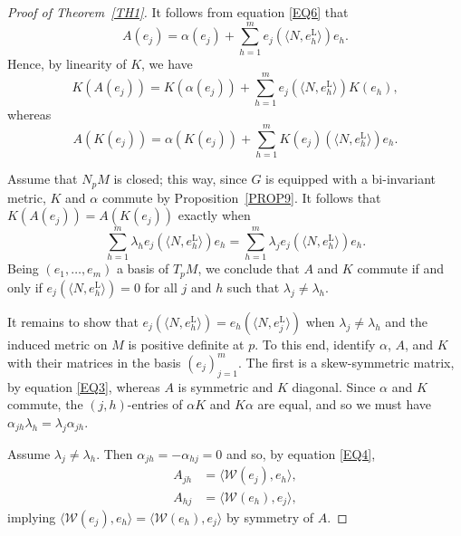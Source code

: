 \documentclass[a4paper,12pt,oneside]{amsart}
\theoremstyle{plain}
\theoremstyle{remark}
\theoremstyle{definition}
\begin{document}
\begin{proof}[Proof of Theorem~\ref{TH1}]
It follows from equation \eqref{EQ6} that
\begin{equation*}
A(e_{j})= \alpha(e_{j}) + \sum_{h=1}^{m}e_{j}(\langle N,e^{\mathrm{L}}_{h}\rangle)e_{h}.
\end{equation*}
Hence, by linearity of $K$, we have
\begin{equation*}
K(A(e_{j})) = K(\alpha(e_{j})) + \sum_{h=1}^{m} e_{j}(\langle N,e^{\mathrm{L}}_{h}\rangle)K(e_{h}),
\end{equation*}
whereas
\begin{equation*}
A(K(e_{j})) = \alpha(K(e_{j})) + \sum_{h=1}^{m} K(e_{j})(\langle N,e^{\mathrm{L}}_{h}\rangle)e_{h}.
\end{equation*}

Assume that $N_{p}M$ is closed; this way, since $G$ is equipped with a bi-invariant metric, $K$ and $\alpha$ commute by Proposition~\ref{PROP9}. It follows that $K(A(e_{j})) = A(K(e_{j}))$ exactly when
\begin{equation*}
\sum_{h=1}^{m} \lambda_{h} e_{j}(\langle N,e^{\mathrm{L}}_{h}\rangle)e_{h} = \sum_{h=1}^{m} \lambda_{j} e_{j}(\langle N,e^{\mathrm{L}}_{h}\rangle)e_{h}.
\end{equation*}
Being $(e_{1}, \dotsc, e_{m})$ a basis of $T_{p}M$, we conclude that $A$ and $K$ commute if and only if $e_{j}(\langle N, e^{\mathrm{L}}_{h}\rangle) = 0$ for all $j$ and $h$ such that $\lambda_{j} \neq \lambda_{h}$.

It remains to show that $e_{j}(\langle N, e^{\mathrm{L}}_{h} \rangle) = e_{h}(\langle N, e^{\mathrm{L}}_{j} \rangle)$ when $\lambda_{j} \neq \lambda_{h}$ and the induced metric on $M$ is positive definite at $p$. To this end, identify $\alpha$, $A$, and $K$ with their matrices in the basis $(e_{j})_{j=1}^{m}$. The first is a skew-symmetric matrix, by equation \eqref{EQ3}, whereas $A$ is symmetric and $K$ diagonal. Since $\alpha$ and $K$ commute, the $(j,h)$-entries of $\alpha K$ and $K\alpha$ are equal, and so we must have $\alpha_{jh}\lambda_{h}= \lambda_{j}\alpha_{jh}$.

Assume $\lambda_{j}\neq\lambda_{h}$. Then $\alpha_{jh}=-\alpha_{hj}=0$ and so, by equation \eqref{EQ4},
\begin{align*}
A_{jh}&= \langle \mathcal{W}(e_{j}),e_{h}\rangle,\\
A_{hj}&= \langle \mathcal{W}(e_{h}),e_{j}\rangle,
\end{align*}
implying $\langle \mathcal{W}(e_{j}),e_{h}\rangle = \langle \mathcal{W}(e_{h}),e_{j}\rangle$ by symmetry of $A$.
\end{proof}
\end{document}
